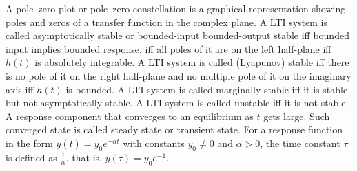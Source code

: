 \documentclass[a4paper,12pt]{report}
\begin{document}
A pole–zero plot or pole–zero constellation is a graphical representation showing poles and zeros of a transfer function in the complex plane.
A LTI system is called asymptotically stable or bounded-input bounded-output stable iff bounded input implies bounded response, iff all poles of it are on the left half-plane iff $h(t)$ is absolutely integrable.
A LTI system is called (Lyapunov) stable iff there is no pole of it on the right half-plane and no multiple pole of it on the imaginary axis iff $h(t)$ is bounded.
A LTI system is called marginally stable iff it is stable but not asymptotically stable.
A LTI system is called unstable iff it is not stable.
A response component that converges to an equilibrium as $t$ gets large. Such converged state is called steady state or transient state.
For a response function in the form $y(t)=y_0e^{-\alpha t}$ with constants $y_0\neq 0$ and $\alpha>0$, the time constant $\tau$ is defined as $\frac{1}{\alpha}$, that is, $y(\tau)=y_0e^{-1}$.
\end{document}
